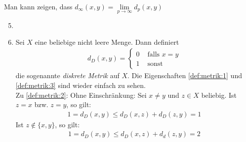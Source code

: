 \begin{Bemerkung}{
	Man kann zeigen, dass $d_{\infty} (x,y) = \lim\limits_{p \rightarrow \infty}{
	d_p(x,y)}$
}\end{Bemerkung}

\begin{Beispiel}{

	\begin{enumerate}\setcounter{enumi}{4}
		\item[]
		\item \label{vl_19_stp_5} Sei $X$ eine beliebige nicht leere Menge. Dann definiert
		\begin{align*}
			d_D(x,y) = \begin{cases} 0 & \text{ falls } x = y \\ 1 & \text{ sonst } \end{cases}
		\end{align*}
		die sogenannte \emph{diskrete  Metrik} auf $X$. Die Eigenschaften \ref{def:metrik:1} und 
		\ref{def:metrik:3} sind wieder einfach zu sehen. \\
		Zu \ref{def:metrik:2}:  Ohne Einschränkung: Sei $x \neq y$ und $z \in X$ beliebig. Ist $z = x$ bzw. $z = y$, so gilt:
		\begin{align*}
			1 = d_D(x,y) \leq d_D(x,z) + d_D(z,y) = 1		
		\end{align*}
		Ist $z \notin \{x,y\}$, so gilt:
		\begin{align*}
			1 = d_D(x,y) \leq d_D(x,z) + d_d(z,y) = 2
		\end{align*}
		

\end{enumerate}}
\end{Beispiel}
